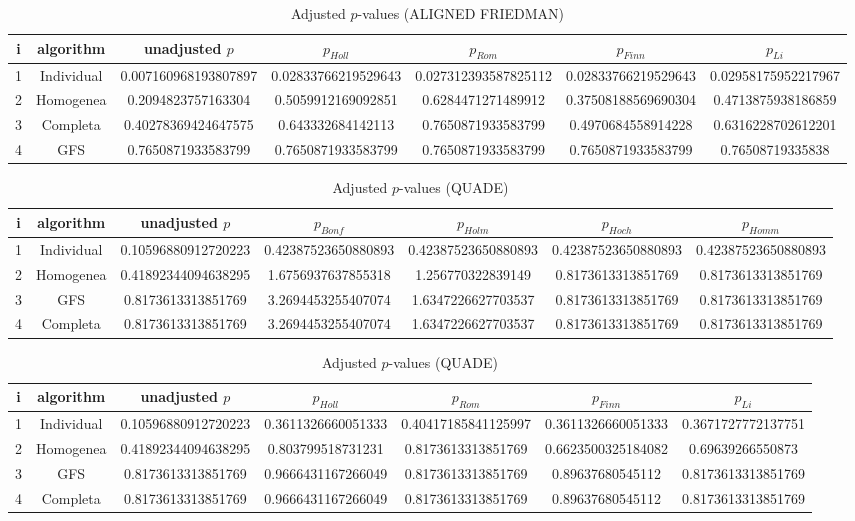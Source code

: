 \documentclass[a4paper,10pt]{article}
\begin{document}
\begin{landscape}
\begin{table}[!htp]
\centering\scriptsize
\caption{Adjusted $p$-values (ALIGNED FRIEDMAN)}
\begin{tabular}{ccccccc}
i&algorithm&unadjusted $p$&$p_{Holl}$&$p_{Rom}$&$p_{Finn}$&$p_{Li}$\\
\hline
1&Individual&0.007160968193807897&0.02833766219529643&0.027312393587825112&0.02833766219529643&0.02958175952217967\\
2&Homogenea&0.2094823757163304&0.5059912169092851&0.6284471271489912&0.37508188569690304&0.4713875938186859\\
3&Completa&0.40278369424647575&0.643332684142113&0.7650871933583799&0.4970684558914228&0.6316228702612201\\
4&GFS&0.7650871933583799&0.7650871933583799&0.7650871933583799&0.7650871933583799&0.76508719335838\\
\hline
\end{tabular}
\end{table}


\newpage

\begin{table}[!htp]
\centering\scriptsize
\caption{Adjusted $p$-values (QUADE)}
\begin{tabular}{ccccccc}
i&algorithm&unadjusted $p$&$p_{Bonf}$&$p_{Holm}$&$p_{Hoch}$&$p_{Homm}$\\
\hline
1&Individual&0.10596880912720223&0.42387523650880893&0.42387523650880893&0.42387523650880893&0.42387523650880893\\
2&Homogenea&0.41892344094638295&1.6756937637855318&1.256770322839149&0.8173613313851769&0.8173613313851769\\
3&GFS&0.8173613313851769&3.2694453255407074&1.6347226627703537&0.8173613313851769&0.8173613313851769\\
4&Completa&0.8173613313851769&3.2694453255407074&1.6347226627703537&0.8173613313851769&0.8173613313851769\\
\hline
\end{tabular}
\end{table}

\begin{table}[!htp]
\centering\scriptsize
\caption{Adjusted $p$-values (QUADE)}
\begin{tabular}{ccccccc}
i&algorithm&unadjusted $p$&$p_{Holl}$&$p_{Rom}$&$p_{Finn}$&$p_{Li}$\\
\hline
1&Individual&0.10596880912720223&0.3611326660051333&0.40417185841125997&0.3611326660051333&0.3671727772137751\\
2&Homogenea&0.41892344094638295&0.803799518731231&0.8173613313851769&0.6623500325184082&0.69639266550873\\
3&GFS&0.8173613313851769&0.9666431167266049&0.8173613313851769&0.89637680545112&0.8173613313851769\\
4&Completa&0.8173613313851769&0.9666431167266049&0.8173613313851769&0.89637680545112&0.8173613313851769\\
\hline
\end{tabular}
\end{table}

\end{landscape}
\end{document}
